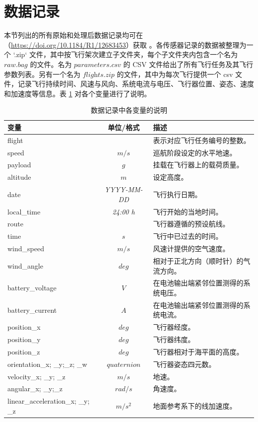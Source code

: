 \documentclass[fleqn,10pt]{wlscirep}
\begin{document}
\section*{数据记录}
本节列出的所有原始和处理后数据记录均可在（\href{https://doi.org/10.1184/R1/12683453}{https://doi.org/10.1184/R1/12683453}）获取 \cite{Rodrigues}。各传感器记录的数据被整理为一个 `.zip` 文件，其中按飞行架次建立子文件夹，每个子文件夹内包含一个名为 $\textit{raw.bag}$ 的文件。名为 $\textit{parameters.csv}$ 的 CSV 文件给出了所有飞行任务及其飞行参数列表。另有一个名为 $\textit{flights.zip}$ 的文件，其中为每次飞行提供一个 csv 文件，记录飞行持续时间、风速与风向、系统电流与电压、飞行器位置、姿态、速度和加速度等信息。表 \ref{tab:variables} 对各个变量进行了说明。
\begin{table}[H]
\centering
\caption{\label{tab:variables} 数据记录中各变量的说明}
\begin{tabular}{|l|c|l|}
\hline
变量 & 单位/格式 & 描述 \\
\hline
flight &  & 表示对应飞行任务编号的整数。 \\
\hline
speed & $m/s$  & 巡航阶段设定的水平地速。 \\
\hline
payload & $g$ & 挂载在飞行器上的载荷质量。 \\
\hline
altitude & $m$ & 设定高度。 \\
\hline
date & \textit{YYYY-MM-DD} & 飞行执行日期。
  \\
\hline
local\_time & \textit{24:00 h} &  飞行开始的当地时间。 \\
\hline
route &  & 飞行器遵循的预设航线。\\
\hline
time & $s$ & 飞行中已过去的时间。 \\
\hline
wind\_speed & $m/s$ & 风速计提供的空气速度。 \\
\hline
wind\_angle & $deg$ & 相对于正北方向（顺时针）的气流方向。
 \\
\hline
battery\_voltage & $V$ & 在电池输出端紧邻位置测得的系统电压。 \\
\hline
battery\_current & $A$ & 在电池输出端紧邻位置测得的系统电流。 \\
\hline
position\_x & $deg$ & 飞行器经度。
 \\
\hline
position\_y & $deg$ & 飞行器纬度。 \\
\hline
position\_z & $deg$ & 飞行器相对于海平面的高度。 \\
\hline
orientation\_x; \_y;\_z; \_w & $quaternion$ & 飞行器姿态四元数。 \\
\hline
velocity\_x; \_y; \_z & $m/s$ & 地速。 \\
\hline
angular\_x; \_y;\_z & $rad/s$ & 角速度。 \\
\hline
linear\_acceleration\_x; \_y; \_z & $m/s^2$ & 地面参考系下的线加速度。 \\
\hline
\end{tabular}

\end{table}
\end{document}
